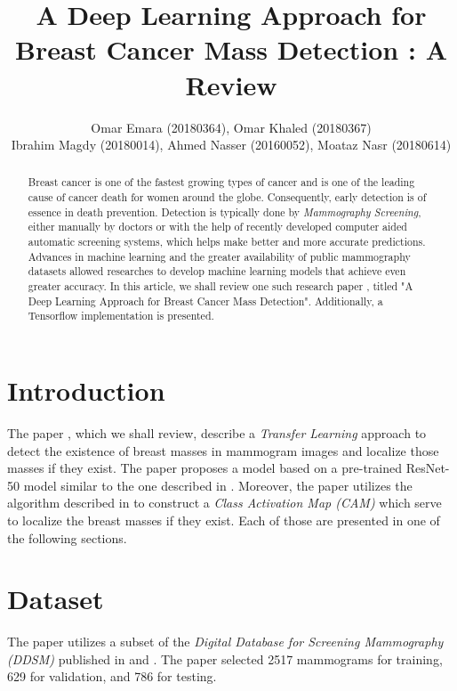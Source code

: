 \documentclass[twocolumn]{article}
\title{A Deep Learning Approach for Breast Cancer Mass Detection : A Review}
\author{
  Omar Emara (20180364), Omar Khaled (20180367) \\
  Ibrahim Magdy (20180014), Ahmed Nasser (20160052), Moataz Nasr (20180614)
}
\begin{document}
\maketitle

\begin{abstract}

  Breast cancer is one of the fastest growing types of cancer and is one of the
  leading cause of cancer death for women around the globe. Consequently, early
  detection is of essence in death prevention. Detection is typically done by
  \emph{Mammography Screening}, either manually by doctors or with the help of
  recently developed computer aided automatic screening systems, which helps
  make better and more accurate predictions. Advances in machine learning and
  the greater availability of public mammography datasets allowed researches to
  develop machine learning models that achieve even greater accuracy. In this
  article, we shall review one such research paper \autocite{Fathy2019}, titled
  "A Deep Learning Approach for Breast Cancer Mass Detection". Additionally, a
  Tensorflow implementation is presented.

\end{abstract}

\section{Introduction}

The paper \autocite{Fathy2019}, which we shall review, describe a \emph{Transfer
Learning} approach to detect the existence of breast masses in mammogram images
and localize those masses if they exist. The paper proposes a model based on a
pre-trained ResNet-50 model similar to the one described in \autocite{He2016}.
Moreover, the paper utilizes the algorithm described in \autocite{Zhou2016} to
construct a \emph{Class Activation Map (CAM)} which serve to localize the breast
masses if they exist. Each of those are presented in one of the following
sections.

\section{Dataset}

The paper utilizes a subset of the \emph{Digital Database for Screening
Mammography (DDSM)} published in \autocite{Bowyer1996} and \autocite{Heath1998}.
The paper selected 2517 mammograms for training, 629 for validation, and 786 for
testing.
\end{document}
